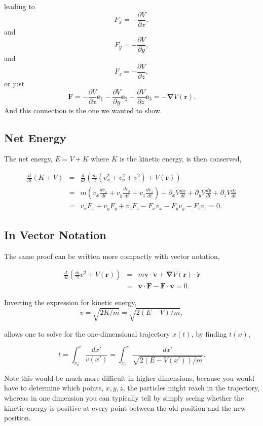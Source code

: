 \documentclass[%
oneside,                 %
final,                   %
10pt]{article}
\begin{document}
leading to
\[
F_x=-\frac{\partial V}{\partial x},
\]
and
\[
F_y=-\frac{\partial V}{\partial y},
\]
and
\[
F_z=-\frac{\partial V}{\partial z},
\]
or just
\[
\bm{F}=-\frac{\partial V}{\partial x}\bm{e}_1-\frac{\partial V}{\partial y}\bm{e}_2-\frac{\partial V}{\partial z}\bm{e}_3=-\bm{\nabla}V(\bm{r}).
\]
And this connection is the one we wanted to show.

\subsection*{Net Energy}

The net energy, $E=V+K$ where $K$ is the kinetic energy, is then conserved,

\begin{eqnarray}
\frac{d}{dt}(K+V)&=&\frac{d}{dt}\left(\frac{m}{2}(v_x^2+v_y^2+v_z^2)+V(\bm{r})\right)\\
\nonumber
&=&m\left(v_x\frac{dv_x}{dt}+v_y\frac{dv_y}{dt}+v_z\frac{dv_z}{dt}\right)
+\partial_xV\frac{dx}{dt}+\partial_yV\frac{dy}{dt}+\partial_zV\frac{dz}{dt}\\
\nonumber
&=&v_xF_x+v_yF_y+v_zF_z-F_xv_x-F_yv_y-F_zv_z=0.
\end{eqnarray}

\subsection*{In Vector Notation}

The same proof can be written more compactly with vector notation,

\begin{eqnarray}
\frac{d}{dt}\left(\frac{m}{2}v^2+V(\bm{r})\right)
&=&m\bm{v}\cdot\dot{\bm{v}}+\bm{\nabla} V(\bm{r})\cdot\dot{\bm{r}}\\
\nonumber
&=&\bm{v}\cdot\bm{F}-\bm{F}\cdot\bm{v}=0.
\end{eqnarray}

Inverting the expression for kinetic energy,
\begin{equation}
v=\sqrt{2K/m}=\sqrt{2(E-V)/m},
\end{equation}

allows one to solve for the one-dimensional trajectory $x(t)$, by finding $t(x)$,

\begin{equation}
t=\int_{x_0}^x \frac{dx'}{v(x')}=\int_{x_0}^x\frac{dx'}{\sqrt{2(E-V(x'))/m}}.
\end{equation}

Note this would be much more difficult in higher dimensions, because
you would have to determine which points, $x,y,z$, the particles might
reach in the trajectory, whereas in one dimension you can typically
tell by simply seeing whether the kinetic energy is positive at every
point between the old position and the new position.
\end{document}
